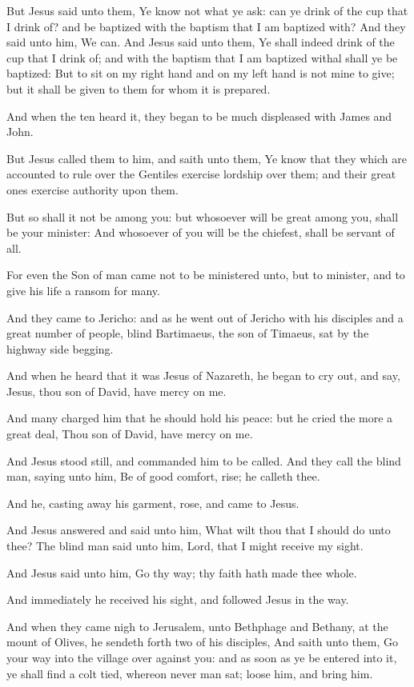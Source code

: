 \Verse But Jesus said unto them, Ye know not what ye ask: can ye drink of the cup that I drink of? and be baptized with the baptism that I am baptized with?  \Verse And they said unto him, We can. And Jesus said unto them, Ye shall indeed drink of the cup that I drink of; and with the baptism that I am baptized withal shall ye be baptized: \Verse But to sit on my right hand and on my left hand is not mine to give; but it shall be given to them for whom it is prepared.

\Verse And when the ten heard it, they began to be much displeased with James and John.

\Verse But Jesus called them to him, and saith unto them, Ye know that they which are accounted to rule over the Gentiles exercise lordship over them; and their great ones exercise authority upon them.

\Verse But so shall it not be among you: but whosoever will be great among you, shall be your minister: \Verse And whosoever of you will be the chiefest, shall be servant of all.

\Verse For even the Son of man came not to be ministered unto, but to minister, and to give his life a ransom for many.

\Verse And they came to Jericho: and as he went out of Jericho with his disciples and a great number of people, blind Bartimaeus, the son of Timaeus, sat by the highway side begging.

\Verse And when he heard that it was Jesus of Nazareth, he began to cry out, and say, Jesus, thou son of David, have mercy on me.

\Verse And many charged him that he should hold his peace: but he cried the more a great deal, Thou son of David, have mercy on me.

\Verse And Jesus stood still, and commanded him to be called. And they call the blind man, saying unto him, Be of good comfort, rise; he calleth thee.

\Verse And he, casting away his garment, rose, and came to Jesus.

\Verse And Jesus answered and said unto him, What wilt thou that I should do unto thee? The blind man said unto him, Lord, that I might receive my sight.

\Verse And Jesus said unto him, Go thy way; thy faith hath made thee whole.

And immediately he received his sight, and followed Jesus in the way.


\Chapter
\Verse And when they came nigh to Jerusalem, unto Bethphage and Bethany, at the mount of Olives, he sendeth forth two of his disciples, \Verse And saith unto them, Go your way into the village over against you: and as soon as ye be entered into it, ye shall find a colt tied, whereon never man sat; loose him, and bring him.

